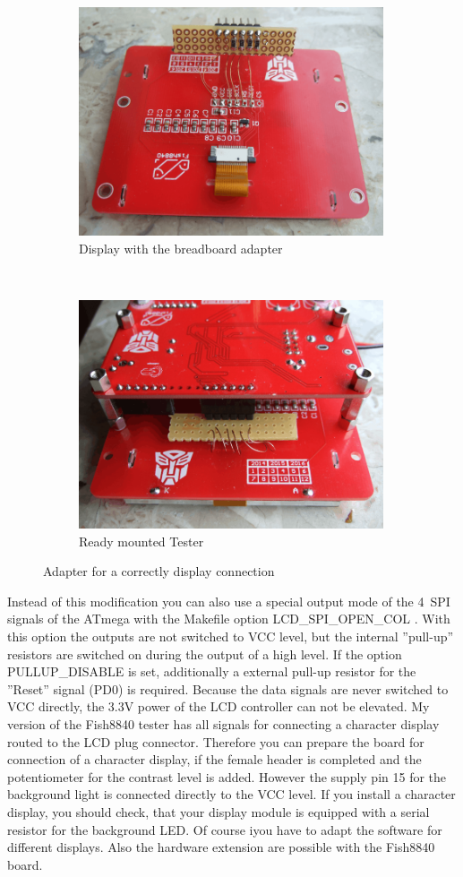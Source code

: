 \begin{figure}[H]
  \begin{subfigure}[b]{9cm}
    \centering
    \includegraphics[width=9cm]{../PNG/Fish8840Adapt1.png}
    \caption{Display with the breadboard adapter}
  \end{subfigure}
  ~
  \begin{subfigure}[b]{9cm}
    \centering
    \includegraphics[width=9cm]{../PNG/Fish8840Adapt2.png}
    \caption{Ready mounted Tester}
  \end{subfigure}
  \caption{Adapter for a correctly display connection}
  \label{fig:Fish8840Adapt}
\end{figure}

Instead of this modification you can also use a special output mode of the 4~SPI signals of the ATmega
with the Makefile option LCD\_SPI\_OPEN\_COL .
With this option the outputs are not switched to VCC level,
but the internal ''pull-up'' resistors are switched on during the output of a high level.
If the option PULLUP\_DISABLE is set, additionally a external pull-up resistor for
the ''Reset'' signal (PD0) is required.
Because the data signals are never switched to VCC directly, the 3.3V power of the LCD controller
can not be elevated.
My version of the Fish8840 tester has all signals for connecting a character display
routed to the LCD plug connector.
Therefore you can prepare the board for connection of a character display, if the
female header is completed and the potentiometer for the contrast level is added.
However the supply pin 15 for the background light is connected directly to the VCC level.
If you install a character display, you should check, that your display module
is equipped with a serial resistor for the background LED.
Of course iyou have to adapt the software for different displays. 
Also the hardware extension are possible with the Fish8840 board.\\

